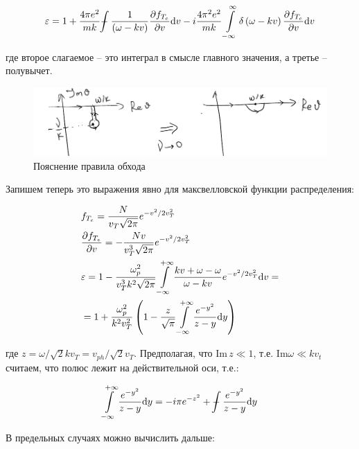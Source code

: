 \documentclass[10pt, a4paper]{article}
\def\Xint#1{\mathchoice
 {\XXint\displaystyle\textstyle{#1}}%
 {\XXint\textstyle\scriptstyle{#1}}%
 {\XXint\scriptstyle\scriptscriptstyle{#1}}%
 {\XXint\scriptscriptstyle\scriptscriptstyle{#1}}%
 \!\int}
\def\XXint#1#2#3{{\setbox0=\hbox{$#1{#2#3}{\int}$}
   \vcenter{\hbox{$#2#3$}}\kern-.5\wd0}}
\def\dashint{\Xint-}
\begin{document}
\begin{equation*}
	\varepsilon = 1 + \frac{4\pi e^2}{mk}\dashint\frac{1}{\left( \omega - kv \right)}\pdv{f_{T_e}}{v}\dd v - i\frac{4\pi^2 e^2}{mk}\int\limits_{-\infty}^{\infty}\delta\left( \omega - kv \right)\pdv{f_{T_e}}{v}\dd v
\end{equation*}

где второе слагаемое -- это интеграл в смысле главного значения, а третье -- полувычет.

\begin{figure}[ht]
	\label{fig.7.pole} 
	\begin{center}
		\includegraphics[width=1\linewidth]{7.pole.pdf}
	\end{center}
	\caption{Пояснение правила обхода}
\end{figure}

Запишем теперь это выражения явно для максвелловской функции распределения:

\begin{align*}
	& f_{T_e} = \frac{N}{v_T\sqrt{2\pi}} e^{-v^2/2 v_T^2} \\
	& \pdv{f_{T_e}}{v} = -\frac{Nv}{v_T^3 \sqrt{2\pi}}e^{-v^2/ 2 v_T^2} \\
	& \varepsilon = 1 - \frac{\omega_p^2}{v_T^3 k^2\sqrt{2\pi}}\int\limits_{-\infty}^{+\infty}\frac{kv + \omega - \omega }{\omega - kv} e^{-v^2/ 2 v_T^2} \dd v = \\
	&= 1 + \frac{\omega_p^2}{k^2 v_T^2} \left( 1 - \frac{z}{\sqrt{\pi}}\int\limits_{-\infty}^{+\infty}\frac{e^{-y^2}}{z-y}\dd y \right)
\end{align*} 

где $z = \omega/\sqrt{2}kv_T = v_{ph}/\sqrt{2}v_T$. Предполагая, что $\text{Im}\,z\ll 1$, т.е. $\text{Im}\omega \ll kv_t$ считаем, что полюс лежит на действительной оси, т.е.:

\begin{equation*}
	\int\limits_{-\infty}^{+\infty}\frac{e^{-y^2}}{z-y}\dd y = -i\pi e^{-z^2} + \dashint\frac{e^{-y^2}}{z-y}\dd y
\end{equation*}

В предельных случаях можно вычислить дальше:
\end{document}
